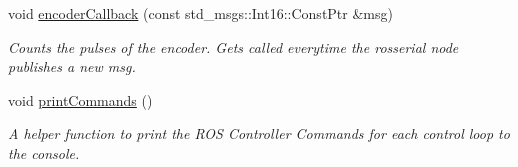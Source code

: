 \begin{DoxyCompactItemize}
\item 
void \hyperlink{classfennec__ns_1_1_fennec_h_w_interface_a918620ccc3c2bc7852b2f9e5fa90c54c}{encoder\+Callback} (const std\+\_\+msgs\+::\+Int16\+::\+Const\+Ptr \&msg)
\begin{DoxyCompactList}\small\item\em Counts the pulses of the encoder. Gets called everytime the rosserial node publishes a new msg. \end{DoxyCompactList}\item 
\mbox{\label{classfennec__ns_1_1_fennec_h_w_interface_ae3d579b889bed76ab21335d767ac4ed4}} 
void \hyperlink{classfennec__ns_1_1_fennec_h_w_interface_ae3d579b889bed76ab21335d767ac4ed4}{print\+Commands} ()
\begin{DoxyCompactList}\small\item\em A helper function to print the R\+OS Controller Commands for each control loop to the console. \end{DoxyCompactList}\end{DoxyCompactItemize}
